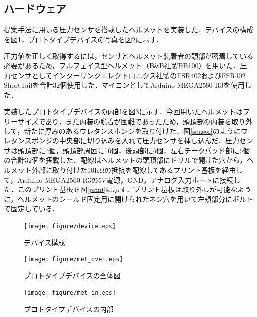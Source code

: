 \documentclass[Japanese,noauthor]{dicomopapers}
\begin{document}
\subsection{ハードウェア}
提案手法に用いる圧力センサを搭載したヘルメットを実装した．デバイスの構成を図\ref{device}，プロトタイプデバイスの写真を図\ref{met_over}に示す．\par

圧力値を正しく取得するには，センサとヘルメット装着者の頭部が密着している必要があるため，フルフェイス型ヘルメット（B\&B社製BB100）を用いた．圧力センサとしてインターリンクエレクトロニクス社製のFSR402およびFSR402 ShortTailを合計32個使用した．マイコンとしてArduino MEGA2560 R3を使用した．\par

実装したプロトタイプデバイスの内部を図\ref{met_in}に示す．今回用いたヘルメットはフリーサイズであり，また内装の脱着が困難であったため，頭頂部の内装を取り外して，新たに厚みのあるウレタンスポンジを取り付けた．図\ref{sensor}のようにウレタンスポンジの中央部に切り込みを入れて圧力センサを挿し込んだ．圧力センサは頭頂部に4個，頭頂部周囲に16個，後頭部に6個，左右チークパッド部に6個の合計32個を搭載した．配線はヘルメットの頭頂部にドリルで開けた穴から，ヘルメット外部に取り付けた10KΩの抵抗を配線してあるプリント基板を経由して，Arduino MEGA2560 R3の5V電源，GND，アナログ入力ポートに接続した．このプリント基板を図\ref{print}に示す．プリント基板は取り外しが可能なように，ヘルメットのシールド固定用に開けられたネジ穴を用いて左頬部分にボルトで固定している．

\begin{figure}[!t]
  \begin{center}
    \texttt{[image: figure/device.eps]}
  \end{center}
  \caption{デバイス構成}
  \label{device}
\end{figure}

\begin{figure}[!t]
  \begin{center}
    \texttt{[image: figure/met\_over.eps]}
  \end{center}
  \caption{プロトタイプデバイスの全体図}
  \label{met_over}
\end{figure}

\begin{figure}[!t]
  \begin{center}
    \texttt{[image: figure/met\_in.eps]}
  \end{center}
  \caption{プロトタイプデバイスの内部}
  \label{met_in}
\end{figure}
\end{document}
